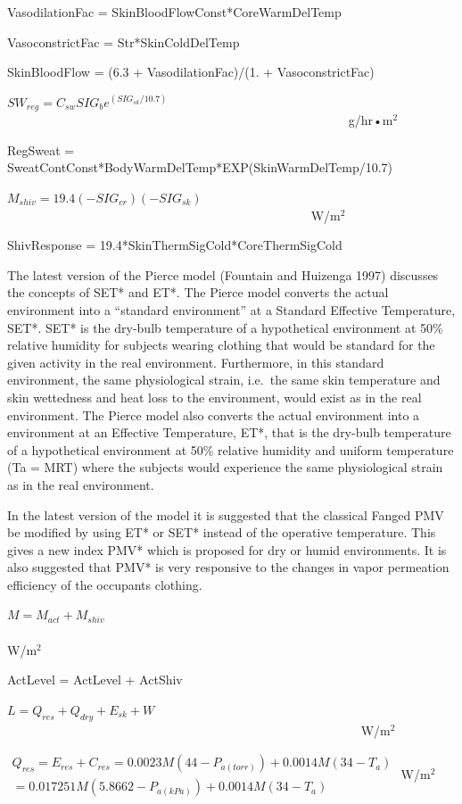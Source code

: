 VasodilationFac = SkinBloodFlowConst*CoreWarmDelTemp

VasoconstrictFac = Str*SkinColdDelTemp

SkinBloodFlow = (6.3 + VasodilationFac)/(1. + VasoconstrictFac)

\(S{W_{reg}} = {C_{sw}}SI{G_b}{e^{(SI{G_{sk}}/10.7)}}\) ~~~~~~~~~~~~~~~~~~~~~~~~~~~~~~~~~~~~~~~~~~~~~~~~~~~~~~ g/hr•m\(^{2}\)

RegSweat = SweatContConst*BodyWarmDelTemp*EXP(SkinWarmDelTemp/10.7)

\({M_{shiv}} = 19.4( - SI{G_{cr}})( - SI{G_{sk}})\) ~~~~~~~~~~~~~~~~~~~~~~~~~~~~~~~~~~~~~~~~~~~~~~~~ W/m\(^{2}\)

ShivResponse = 19.4*SkinThermSigCold*CoreThermSigCold

The latest version of the Pierce model (Fountain and Huizenga 1997) discusses the concepts of SET* and ET*. The Pierce model converts the actual environment into a ``standard environment'' at a Standard Effective Temperature, SET*. SET* is the dry-bulb temperature of a hypothetical environment at 50\% relative humidity for subjects wearing clothing that would be standard for the given activity in the real environment. Furthermore, in this standard environment, the same physiological strain, i.e.~the same skin temperature and skin wettedness and heat loss to the environment, would exist as in the real environment. The Pierce model also converts the actual environment into a environment at an Effective Temperature, ET*, that is the dry-bulb temperature of a hypothetical environment at 50\% relative humidity and uniform temperature (Ta = MRT) where the subjects would experience the same physiological strain as in the real environment.

In the latest version of the model it is suggested that the classical Fanged PMV be modified by using ET* or SET* instead of the operative temperature. This gives a new index PMV* which is proposed for dry or humid environments. It is also suggested that PMV* is very responsive to the changes in vapor permeation efficiency of the occupants clothing.

\(M = {M_{act}} + {M_{shiv}}\) ~~~~~~~~~~~~~~~~~~~~~~~~~~~~~~~~~~~~~~~~~~~~~~~~~~~~~~~~~~~~~~~~~~~~ W/m\(^{2}\)

ActLevel = ActLevel + ActShiv

\(L = {Q_{res}} + {Q_{dry}} + {E_{sk}} + W\) ~~~~~~~~~~~~~~~~~~~~~~~~~~~~~~~~~~~~~~~~~~~~~~~~~~~~~~~~ W/m\(^{2}\)

\(\begin{array}{l}{Q_{res}} = {E_{res}} + {C_{res}} = 0.0023M(44 - {P_{a(torr)}}) + 0.0014M(34 - {T_a})\\ = 0.017251M(5.8662 - {P_{a(kPa)}}) + 0.0014M(34 - {T_a})\end{array}\) W/m\(^{2}\)

